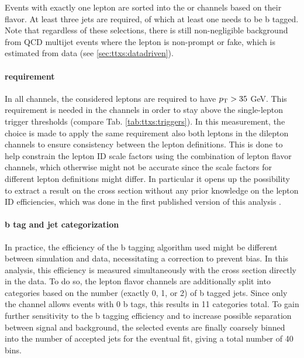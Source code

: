 Events with exactly one lepton are sorted into the \ejets or \mujets channels based on their flavor. At least three jets are required, of which at least one needs to be b tagged. Note that regardless of these selections, there is still non-negligible background from QCD multijet events where the lepton is non-prompt or fake, which is estimated from data (see \cref{sec:ttxs:datadriven}).

\paragraph{\pt requirement}

In all channels, the considered leptons are required to have $p_{\mathrm{T}} > 35$ GeV. This requirement is needed in the \ljets channels in order to stay above the single-lepton trigger \pt thresholds (compare Tab. \ref{tab:ttxs:triggers}). In this measurement, the choice is made to apply the same \pt requirement also both leptons in the dilepton channels to ensure consistency between the lepton definitions. This is done to help constrain the lepton ID scale factors using the combination of lepton flavor channels, which otherwise might not be accurate since the scale factors for different lepton definitions might differ. In particular it opens up the possibility to extract a result on the cross section without any prior knowledge on the lepton ID efficiencies, which was done in the first published version of this analysis \cite{CMS:TOP-22-012-PAS}. %

\paragraph{b tag and jet categorization}

In practice, the efficiency of the b tagging algorithm used might be different between simulation and data, necessitating a correction to prevent bias. In this analysis, this efficiency is measured simultaneously with the cross section directly in the data. To do so, the lepton flavor channels are additionally split into categories based on the number (exactly 0, 1, or 2) of b tagged jets. Since only the \emu channel allows events with 0 b tags, this results in 11 categories total. To gain further sensitivity to the b tagging efficiency and to increase possible separation between \ttbar signal and background, the selected events are finally coarsely binned into the number of accepted jets for the eventual fit, giving a total number of 40 bins.


